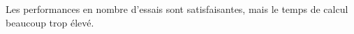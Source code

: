 
Les performances en nombre d'essais sont satisfaisantes, mais le temps de calcul beaucoup trop élevé. 

 
